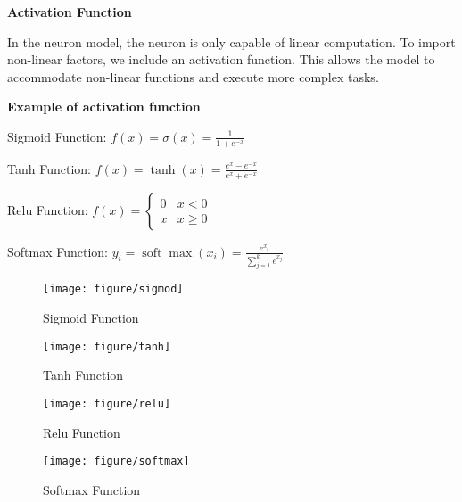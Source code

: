 \documentclass{article}
\begin{document}
    
    \hspace*{\fill}
    \begin{mdframed}[hidealllines=false,backgroundcolor=white!20]
    \textbf{Activation Function}

    In the neuron model, the neuron is only capable of linear computation. To import non-linear factors, we include an activation function. This allows the model to accommodate non-linear functions and execute more complex tasks.

    \textbf{ Example of activation function}


        \hspace*{\fill}

        Sigmoid Function:
        $f(x)=\sigma(x)=\frac{1}{1+e^{-x}}$
        \hspace*{\fill}


        \hspace*{\fill}

        Tanh Function:
        $f(x)=\tanh (x)=\frac{e^x-e^{-x}}{e^x+e^{-x}}$
        \hspace*{\fill}

        \hspace*{\fill}

        Relu Function:
        $f(x)= \begin{cases}0 & x<0 \\ x & x \geq 0\end{cases}$
        \hspace*{\fill}

        \hspace*{\fill}

        Softmax Function:
        $y_i=\operatorname{soft} \max \left(x_i\right)=\frac{e^{x_i}}{\sum_{j=1}^k e^{x_j}}$
        \hspace*{\fill}


    \end{mdframed}




    \begin{figure}[htbp]
    \centering
    \begin{minipage}[t]{0.48\textwidth}
    \centering
    \texttt{[image: figure/sigmod]}
    \caption{Sigmoid Function}
    \end{minipage}
    \begin{minipage}[t]{0.48\textwidth}
    \centering
    \texttt{[image: figure/tanh]}
    \caption{Tanh Function}
    \end{minipage}

    \centering
    \begin{minipage}[t]{0.48\textwidth}
    \centering
    \texttt{[image: figure/relu]}
    \caption{Relu Function}
    \end{minipage}
    \begin{minipage}[t]{0.48\textwidth}
    \centering
    \texttt{[image: figure/softmax]}
    \caption{Softmax Function}
    \end{minipage}
    \end{figure}
\end{document}
